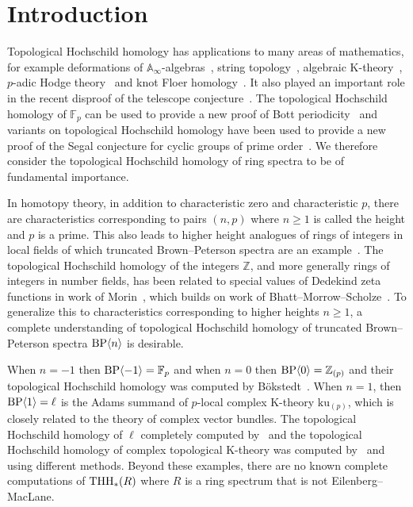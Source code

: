 %

\section{Introduction}
Topological Hochschild homology has applications to many areas of mathematics, for example deformations of $\mathbb{A}_{\infty}$-algebras~\cite{Laz01}, string topology~\cite{CJ02}, algebraic K-theory~\cite{BHM93}, $p$-adic Hodge theory~\cite{BMS19}  and knot Floer homology~\cite{LOT15}. It also played an important role in the recent disproof of the telescope conjecture~\cite{BHLS23}. The topological Hochschild homology of $\mathbb{F}_p$ can be used to provide a new proof of Bott periodicity~\cite{HN20} and variants on topological Hochschild homology have been used to provide a new proof of the Segal conjecture for cyclic groups of prime order~\cites{HW21,AKZ25}. 
We therefore consider the topological Hochschild homology of ring spectra to be of fundamental importance. 

In homotopy theory, in addition to characteristic zero and characteristic $p$, there are characteristics corresponding to pairs $(n,p)$ where $n\ge 1$ is called the height and $p$ is a prime. This also leads to higher height analogues of rings of integers in local fields of which truncated Brown--Peterson spectra are an example~\cite{Rog25}. The topological Hochschild homology of the integers $\mathbb{Z}$, and more generally rings of integers in number fields, has been related to special values of Dedekind zeta functions in work of Morin~\cite{Mor24}, which builds on work of Bhatt--Morrow--Scholze~\cite{BMS19}. To generalize this to characteristics corresponding to higher heights $n\ge 1$, a complete understanding of topological Hochschild homology of truncated Brown--Peterson spectra $\mathrm{BP}\langle n\rangle$ is desirable.



When $n=-1$ then $\mathrm{BP}\langle -1\rangle=\mathbb{F}_p$ and when $n=0$ then $\mathrm{BP}\langle 0\rangle=\mathbb{Z}_{(p)}$ and their topological Hochschild homology was computed by B\"okstedt~\cite{Bok85}. When $n=1$, then $\mathrm{BP}\langle 1\rangle=\ell$ is the Adams summand of $p$-local complex K-theory $\mathrm{ku}_{(p)}$, which is closely related to the theory of complex vector bundles. The topological Hochschild homology of $\ell$ completely computed by~\cite{AHL10} and the topological Hochschild homology of complex topological K-theory was computed by~\cite{Lee22} and \cite{Cha25} using different methods. Beyond these examples, there are no known complete computations of $\operatorname{THH}_*(R)$ where $R$ is a ring spectrum that is not Eilenberg--MacLane.

